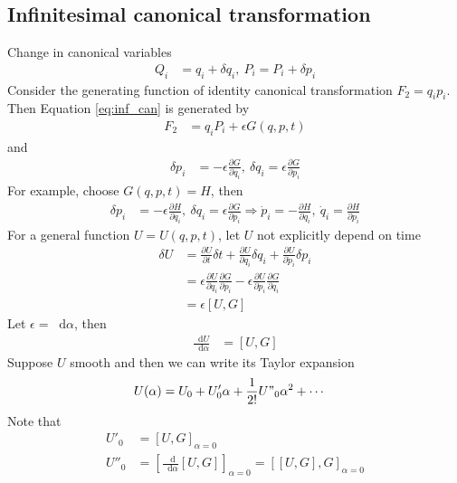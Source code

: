 \documentclass[twoside,9pt]{article}
\numberwithin{equation}{section} %
\renewcommand*\d{\mathop{}\!\mathrm{d}}
\theoremstyle{definition}
\theoremstyle{remark}
\begin{document}
\subsection{Infinitesimal canonical transformation}
Change in canonical variables
\begin{align}
    Q_i &= q_i + \delta q_i,~
    P_i  = P_i + \delta p_i
    \label{eq:inf_can}
\end{align}
Consider the generating function of identity canonical transformation
$F_2 = q_ip_i$.
Then Equation \ref{eq:inf_can} is generated by
\begin{align}
    F_2 &= q_iP_i + \epsilon G(q,p,t)
\end{align}
and
\begin{align}
    \delta p_i &= -\epsilon \frac{\partial G}{\partial q_i},~
    \delta q_i  = \epsilon \frac{\partial G}{\partial p_i}
\end{align}
For example, choose $G(q,p,t) = H$, then
\begin{align}
    \delta p_i &= -\epsilon \frac{\partial H}{\partial q_i},~
    \delta q_i  = \epsilon \frac{\partial G}{\partial p_i}
    \Rightarrow
    \dot p_i = -\frac{\partial H}{\partial q_i},~
    \dot q_i = \frac{\partial H}{\partial p_i}
\end{align}
For a general function $U=U(q,p,t)$, let $U$ not explicitly depend on time
\begin{align}
    \delta U &= \frac{\partial U}{\partial t}\delta t + 
    \frac{\partial U}{\partial q_i}\delta q_i + 
    \frac{\partial U}{\partial\dot p_i}\delta p_i\\
    &= \epsilon \frac{\partial U}{\partial q_i}\frac{\partial G}{\partial p_i}
    - \epsilon\frac{\partial U}{\partial p_i}\frac{\partial G}{\partial q_i}\\
    &= \epsilon[U, G]
\end{align}
Let $\epsilon = \d\alpha$, then
\begin{align}
    \frac{\d U}{\d \alpha} &= [U, G]
\end{align}
Suppose $U$ smooth and then we can write its Taylor expansion
\begin{align}
    U(\alpha) &= U_0 + U'_0\alpha + \frac{1}{2!}U"_0\alpha^2 + \cdots
\end{align}
Note that
\begin{align}
    U'_0 &= [U,G]_{\alpha=0}\\
    U''_0 &= \left[\frac{\d}{\d\alpha}[U, G]\right]_{\alpha=0}
    = [[U,G],G]_{\alpha=0}
\end{align}
\end{document}
